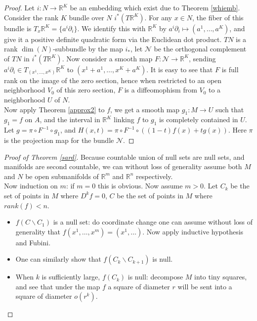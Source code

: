 \documentclass{article}
\theoremstyle{definition}
\begin{document}
\begin{proof}
   Let $i: N\rightarrow\mathbb{R}^K$ be an embedding which exist due to Theorem \ref{whiemb}.  Consider the rank $K$ bundle over $N$ $i^*(T\mathbb{R}^K)$. For any $x\in N$, the fiber of this bundle is $T_x\mathbb{R}^K=\{a^i\partial_i\}$. We identify this with $\mathbb{R}^K$ by $a^i\partial_i\mapsto (a^1, \dots, a^K)$, and give it a positive definite quadratic form via the Euclidean dot product. $TN$ is a rank $\dim(N)$-subbundle by the map $i_*$, let $\mathcal{N}$ be the orthogonal complement of $TN$ in $i^*(T\mathbb{R}^K)$. Now consider a smooth map $F: \mathcal{N}\rightarrow \mathbb{R}^K$, sending $a^i\partial_i\in T_(x^1, \dots, x^K)\mathbb{R}^K$ to $(x^1+a^1, \dots, x^K+a^K)$. It is easy to see that $F$ is full rank on the image of the zero section, hence when restricted to an open neighborhood $V_0$ of this zero section, $F$ is a diffeomophism from $V_0$ to a neighborhood $U$ of $N$.\\

   Now apply Theorem \ref{approx2} to $f$, we get a smooth map $g_1: M\rightarrow U$ such that $g_1=f$ on $A$, and the interval in $\mathbb{R}^K$ linking $f$ to $g_1$ is completely contained in $U$. Let $g=\pi\circ F^{-1}\circ g_1$, and $H(x, t)=\pi\circ F^{-1}\circ((1-t)f(x)+tg(x))$. Here $\pi$ is the projection map for the bundle $\mathcal{N}$.
\end{proof}

\begin{proof}[Proof of Theorem \ref{sard}]
    Because countable union of null sets are null sets, and manifolds are second countable, we can without loss of generality assume both $M$ and $N$ be open submanifolds of $\mathbb{R}^m$ and $\mathbb{R}^n$ respectively.\\

    Now induction on $m$: if $m=0$ this is obvious. Now assume $m>0$. Let $C_k$ be the set of points in $M$ where $D^kf=0$, $C$ be the set of points in $M$ where $rank(f)<n$.

    \begin{itemize}
        \item $f(C\backslash C_1)$ is a null set:  do coordinate change one can assume without loss of generality that $f(x^1, \dots, x^m)=(x^1, \dots)$. Now apply inductive hypothesis and Fubini. 
        \item One can similarly show that $f(C_k\backslash C_{k+1})$ is null.
        \item When $k$ is sufficiently large, $f(C_k)$ is null: decompose $M$ into tiny squares, and see that under the map $f$ a square of diameter $r$ will be sent into a square of diameter $o(r^k)$.
    \end{itemize}
\end{proof}
\end{document}
